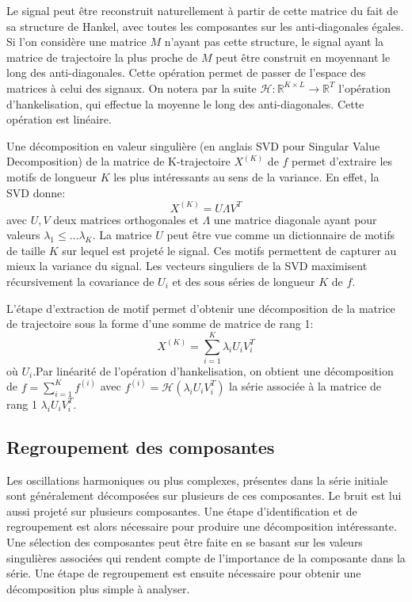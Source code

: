 \documentclass{gretsi}
\def\HH{\mathcal H}
\newcommand{\R}{\mathbb R}
\begin{document}
Le signal peut être reconstruit naturellement à partir de cette matrice du fait de sa structure de Hankel, avec toutes les composantes sur les anti-diagonales égales. Si l'on considère une matrice $M$ n'ayant pas cette structure, le signal ayant la matrice de trajectoire la plus proche de $M$ peut être construit en moyennant le long des anti-diagonales. Cette opération permet de  passer de l'espace des matrices à celui des signaux. On notera par la suite $\HH: \R^{K\times L} \to \R^T$ l'opération d'hankelisation, qui effectue la moyenne le long des anti-diagonales. Cette opération est linéaire.



Une décomposition en valeur singulière (en anglais SVD pour Singular Value Decomposition) de la matrice de K-trajectoire $X^{(K)}$ de $f$ permet d'extraire les motifs de longueur $K$ les plus intéressants au sens de la variance. En effet, la SVD donne: 
$$X^{(K)} = U \Lambda V^T
$$ avec $U, V$ deux matrices orthogonales et $\Lambda$ une matrice diagonale ayant pour valeurs $\lambda_1\le \dots \lambda_K$. La matrice $U$ peut être vue comme un dictionnaire de motifs de taille $K$ sur lequel est projeté le signal. Ces motifs permettent de capturer au mieux la variance du signal. Les vecteurs singuliers de la SVD maximisent récursivement la covariance de $U_i$ et des sous séries de longueur $K$ de $f$.



L'étape d'extraction de motif permet d'obtenir une décomposition de la matrice de trajectoire sous la forme d'une somme de matrice de rang 1:$$
X^{(K)} = \sum_{i=1}^K \lambda_i U_iV_i^T 
$$où  $U_i$.Par linéarité de l'opération d'hankelisation, on obtient une décomposition de $f = \sum_{i=1}^K f^{(i)}$ avec $f^{(i)} = \HH(\lambda_iU_iV_i^T)$ la série associée à la matrice de rang 1 $\lambda_iU_iV_i^T$.


\subsection{Regroupement des composantes}

Les oscillations harmoniques ou plus complexes, présentes dans la série initiale sont généralement décomposées sur plusieurs de ces composantes. Le bruit est lui aussi projeté sur plusieurs composantes. Une étape d'identification et de regroupement est alors nécessaire pour produire une décomposition intéressante. Une sélection des composantes peut être faite en se basant sur les valeurs singulières associées qui rendent compte de l'importance de la composante dans la série. Une étape de regroupement est ensuite nécessaire pour obtenir une décomposition plus simple à analyser.
\end{document}
